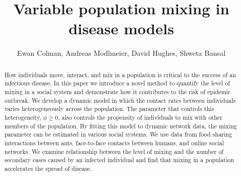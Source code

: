 \documentclass[10pt]{article}
\title{Variable population mixing in disease models}
\author[1]{Ewan Colman, Andreas Modlmeier, David Hughes, Shweta Bansal}
\begin{document}
\maketitle
\vspace{-0.7cm}
\begin{abstract}
\noindent\normalsize
How individuals move, interact, and mix in a population is critical to the success of an infectious disease. In this paper we introduce a novel method to quantify the level of mixing in a social system and demonstrate how it contributes to the risk of epidemic outbreak. We develop a dynamic model in which the contact rates between individuals varies heterogeneously across the population. The parameter that controls this heterogeneity, $\phi\geq 0$, also controls the propensity of individuals to mix with other members of the population. By fitting this model to dynamic network data, the mixing parameter can be estimated in various social systems. We use data from food sharing interactions between ants, face-to-face contacts between humans, and online social networks. We examine relationship between the level of mixing and the number of secondary cases caused by an infected individual and find that mixing in a population accelerates the spread of disease. 
\end{abstract}
\vspace{0.5cm}
\end{document}
